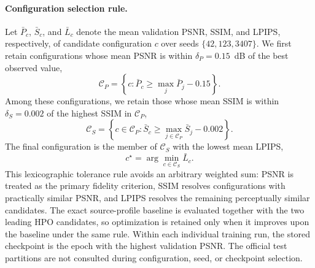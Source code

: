 
\paragraph{Configuration selection rule.}
Let $\bar{P}_c$, $\bar{S}_c$, and $\bar{L}_c$ denote the mean validation
PSNR, SSIM, and LPIPS, respectively, of candidate configuration $c$ over seeds
$\{42,123,3407\}$. We first retain configurations whose mean PSNR is within
$\delta_P=0.15$~dB of the best observed value,
\begin{equation}
  \mathcal{C}_{P}
  = \left\{c:\bar{P}_c \geq \max_j \bar{P}_j-0.15\right\}.
  \label{eq:hpo-psnr-tolerance}
\end{equation}
Among these configurations, we retain those whose mean SSIM is within
$\delta_S=0.002$ of the highest SSIM in $\mathcal{C}_{P}$,
\begin{equation}
  \mathcal{C}_{S}
  = \left\{c\in\mathcal{C}_{P}:\bar{S}_c
  \geq \max_{j\in\mathcal{C}_{P}}\bar{S}_j-0.002\right\}.
  \label{eq:hpo-ssim-tolerance}
\end{equation}
The final configuration is the member of $\mathcal{C}_{S}$ with the lowest
mean LPIPS,
\begin{equation}
  c^{\star}=\arg\min_{c\in\mathcal{C}_{S}}\bar{L}_c.
  \label{eq:hpo-lpips-selection}
\end{equation}
This lexicographic tolerance rule avoids an arbitrary weighted sum: PSNR is
treated as the primary fidelity criterion, SSIM resolves configurations with
practically similar PSNR, and LPIPS resolves the remaining perceptually similar
candidates. The exact source-profile baseline is evaluated together with the
two leading HPO candidates, so optimization is retained only when it improves
upon the baseline under the same rule. Within each individual training run,
the stored checkpoint is the epoch with the highest validation PSNR. The
official test partitions are not consulted during configuration, seed, or
checkpoint selection.

